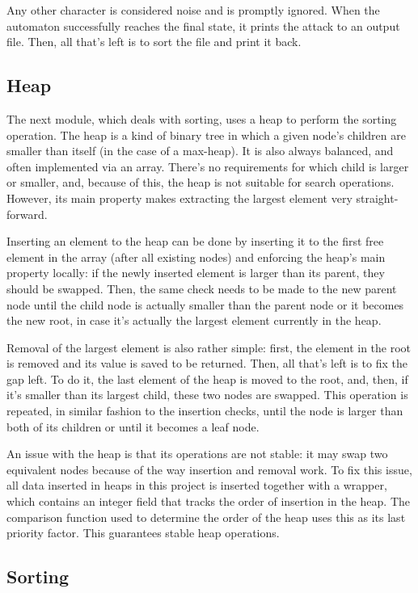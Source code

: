 \documentclass[10pt,a4paper]{article}
\numberwithin{equation}{section}
\begin{document}
Any other character is considered noise and is promptly ignored. When the automaton successfully reaches the final state, it prints the attack to an output file. Then, all that's left is to sort the file and print it back.

\subsection{Heap}

The next module, which deals with sorting, uses a heap to perform the sorting operation. The heap is a kind of binary tree in which a given node's children are smaller than itself (in the case of a max-heap). It is also always balanced, and often implemented via an array. There's no requirements for which child is larger or smaller, and, because of this, the heap is not suitable for search operations. However, its main property makes extracting the largest element very straight-forward.

Inserting an element to the heap can be done by inserting it to the first free element in the array (after all existing nodes) and enforcing the heap's main property locally: if the newly inserted element is larger than its parent, they should be swapped. Then, the same check needs to be made to the new parent node until the child node is actually smaller than the parent node or it becomes the new root, in case it's actually the largest element currently in the heap.

Removal of the largest element is also rather simple: first, the element in the root is removed and its value is saved to be returned. Then, all that's left is to fix the gap left. To do it, the last element of the heap is moved to the root, and, then, if it's smaller than its largest child, these two nodes are swapped. This operation is repeated, in similar fashion to the insertion checks, until the node is larger than both of its children or until it becomes a leaf node.

An issue with the heap is that its operations are not stable: it may swap two equivalent nodes because of the way insertion and removal work. To fix this issue, all data inserted in heaps in this project is inserted together with a wrapper, which contains an integer field that tracks the order of insertion in the heap. The comparison function used to determine the order of the heap uses this as its last priority factor. This guarantees stable heap operations.

\subsection{Sorting}
\end{document}
